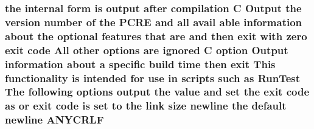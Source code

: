 \subsubsection[{\texorpdfstring{A\+N\+Y\+C\+R\+LF}{ANYCRLF}}]{\setlength{\rightskip}{0pt plus 5cm}the internal form {\bf is} {\bf output} {\bf after} {\bf compilation} {\bf C} Output the version {\bf number} {\bf of} the {\bf P\+C\+RE} and {\bf all} avail {\bf able} information about the {\bf optional} {\bf features} that {\bf are} and then {\bf exit} {\bf with} {\bf zero} {\bf exit} {\bf code} All other {\bf options} {\bf are} {\bf ignored} {\bf C} {\bf option} Output information about {\bf a} specific build {\bf time} then {\bf exit} This functionality {\bf is} intended for use {\bf in} {\bf scripts} such {\bf as} Run\+Test The following {\bf options} {\bf output} the {\bf value} and {\bf set} the {\bf exit} {\bf code} {\bf as} {\bf or} {\bf exit} {\bf code} {\bf is} {\bf set} {\bf to} the link {\bf size} {\bf newline} the {\bf default} {\bf newline} A\+N\+Y\+C\+R\+LF}\hypertarget{pcretest_8txt_a10eeee1c4967eb816ffd9c696a9b3ef8}{}\label{pcretest_8txt_a10eeee1c4967eb816ffd9c696a9b3ef8}
